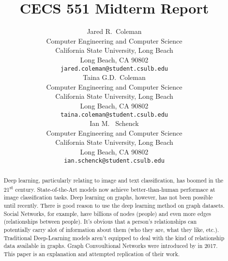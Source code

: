 \documentclass{article}
\title{CECS 551 Midterm Report}
\author{%
  Jared R.~Coleman\\
  Computer Engineering and Computer Science\\
  California State University, Long Beach\\
  Long Beach, CA 90802 \\
  \texttt{jared.coleman@student.csulb.edu} \\
  \And 
  Taina G.D.~Coleman\\
  Computer Engineering and Computer Science\\
  California State University, Long Beach\\
  Long Beach, CA 90802 \\
  \texttt{taina.coleman@student.csulb.edu} \\
  \And 
  Ian M. ~Schenck\\
  Computer Engineering and Computer Science\\
  California State University, Long Beach\\
  Long Beach, CA 90802 \\
  \texttt{ian.schenck@student.csulb.edu} \\
}
\begin{document}
\setcounter{equation}{0}

\maketitle

\begin{abstract}
  Deep learning, particularly relating to image and text classification, has boomed in the 21\textsuperscript{st} century. State-of-the-Art models now achieve better-than-human performace at image classification tasks. Deep learning on graphs, however, has not been possible until recently. There is good reason to use the deep learning method on graph datasets. Social Networks, for example, have billions of nodes (people) and even more edges (relationships between people). It's obvious that a person's relationships can potentially carry alot of information about them (who they are, what they like, etc.). Traditional Deep-Learning models aren't equipped to deal with the kind of relationship data available in graphs. Graph Convoultional Networks were introduced by \cite{Kipf2016} in 2017. This paper is an explanation and attempted replication of their work.
\end{abstract}

 




  


\end{document}
